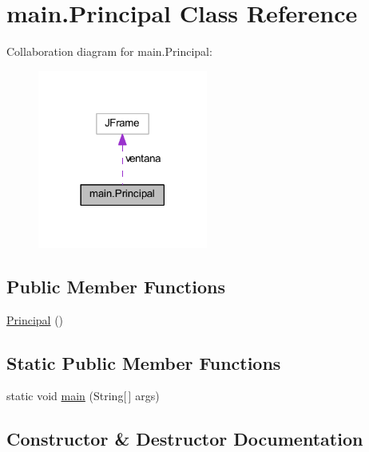\hypertarget{classmain_1_1_principal}{}\section{main.\+Principal Class Reference}
\label{classmain_1_1_principal}


Collaboration diagram for main.\+Principal\+:
\nopagebreak
\begin{figure}[H]
\begin{center}
\leavevmode
\includegraphics[width=158pt]{classmain_1_1_principal__coll__graph}
\end{center}
\end{figure}
\subsection*{Public Member Functions}
\begin{DoxyCompactItemize}
\item 
\mbox{\hyperlink{classmain_1_1_principal_ac8d78a8bf8fa59afabd1c8dc8de7063d}{Principal}} ()
\end{DoxyCompactItemize}
\subsection*{Static Public Member Functions}
\begin{DoxyCompactItemize}
\item 
static void \mbox{\hyperlink{classmain_1_1_principal_aa28fb81dfdd4ce81c98f62953d4fc72d}{main}} (String\mbox{[}$\,$\mbox{]} args)
\end{DoxyCompactItemize}


\subsection{Constructor \& Destructor Documentation}
\mbox{\label{classmain_1_1_principal_ac8d78a8bf8fa59afabd1c8dc8de7063d}} 
